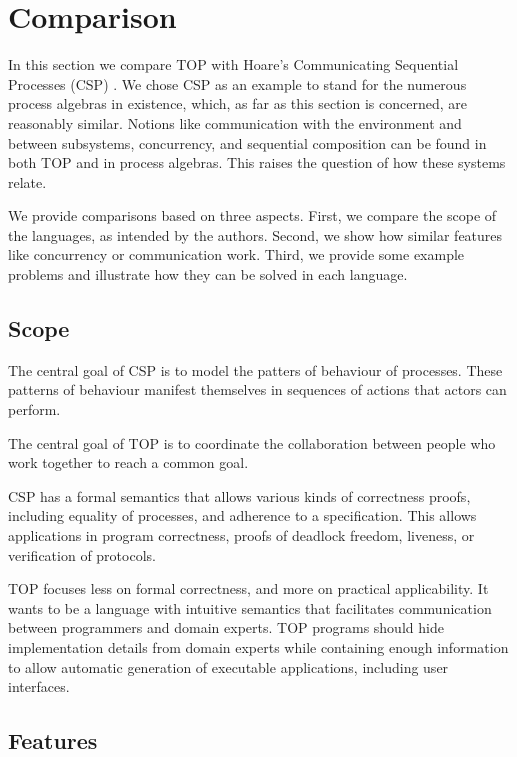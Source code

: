 
\section{Comparison}

In this section we compare TOP with Hoare's Communicating Sequential Processes (CSP) \cite{books/Hoare85CSP}.
We chose CSP as an example to stand for the numerous process algebras in existence, which, as far as this section is concerned, are reasonably similar.
Notions like communication with the environment and between subsystems, concurrency, and sequential composition can be found in both TOP and in process algebras.
This raises the question of how these systems relate.

We provide comparisons based on three aspects.
First, we compare the scope of the languages, as intended by the authors.
Second, we show how similar features like concurrency or communication work.
Third, we provide some example problems and illustrate how they can be solved in each language.

\subsection{Scope}

The central goal of CSP is to model the patters of behaviour of processes.
These patterns of behaviour manifest themselves in sequences of actions that actors can perform.

The central goal of TOP is to coordinate the collaboration between people who work together to reach a common goal.

CSP has a formal semantics that allows various kinds of correctness proofs, including equality of processes, and adherence to a specification.
This allows applications in program correctness, proofs of deadlock freedom, liveness, or verification of protocols.

TOP focuses less on formal correctness, and more on practical applicability.
It wants to be a language with intuitive semantics that facilitates communication between programmers and domain experts.
TOP programs should hide implementation details from domain experts while containing enough information to allow automatic generation of executable applications, including user interfaces.

\subsection{Features}

